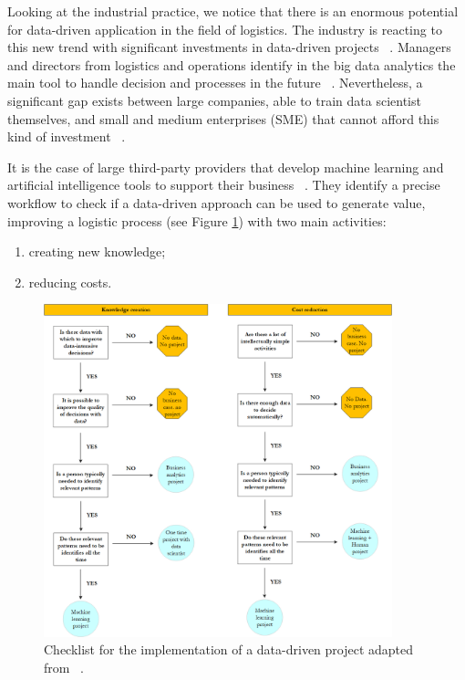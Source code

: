 Looking at the industrial practice, we notice that there is an enormous potential for data-driven application in the field of logistics. The industry is reacting to this new trend with significant investments in data-driven projects ~\cite{Worldeconomicforum2017, Zhong2016}. Managers and directors from logistics and operations identify in the big data analytics the main tool to handle decision and processes in the future ~\cite{Rossmann2018}. Nevertheless, a significant gap exists between large companies, able to train data scientist themselves, and small and medium enterprises (SME) that cannot afford this kind of investment ~\cite{Dubey2019}.\par

It is the case of large third-party providers that develop machine learning and artificial intelligence tools to support their business ~\cite{Ku2018}. They identify a precise workflow to check if a data-driven approach can be used to generate value, improving a logistic process (see Figure \ref{fig_applicationML}) with two main activities:

\begin{enumerate}
    \item creating new knowledge;
    \item reducing costs.

\end{enumerate}

\begin{figure}[hbt!]
\centering
\includegraphics[width=0.9\textwidth]{SectionIntroduction/researchBackground_figures/fig_applicationML.png}
\captionsetup{type=figure}
\caption{Checklist for the implementation of a data-driven project adapted from ~\cite{Ku2018}.}
\label{fig_applicationML}
\end{figure}

